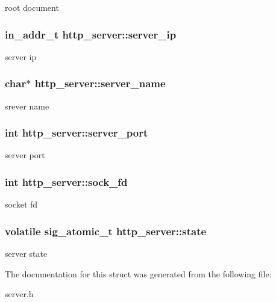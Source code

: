 \label{structhttp__server_a25d2bb352f5d3fdd09ce7fbe266f6aac}
root document \hypertarget{structhttp__server_ad3110d5628168b14bcdcc7a7fed3f021}{
\subsubsection[{server\_\-ip}]{\setlength{\rightskip}{0pt plus 5cm}in\_\-addr\_\-t {\bf http\_\-server::server\_\-ip}}}
\label{structhttp__server_ad3110d5628168b14bcdcc7a7fed3f021}
server ip \hypertarget{structhttp__server_afdeb11488dbc8aa350c3f7506ec65eba}{
\subsubsection[{server\_\-name}]{\setlength{\rightskip}{0pt plus 5cm}char$\ast$ {\bf http\_\-server::server\_\-name}}}
\label{structhttp__server_afdeb11488dbc8aa350c3f7506ec65eba}
srever name \hypertarget{structhttp__server_a8f2e0f8f3c7919c65797bd2839723f45}{
\subsubsection[{server\_\-port}]{\setlength{\rightskip}{0pt plus 5cm}int {\bf http\_\-server::server\_\-port}}}
\label{structhttp__server_a8f2e0f8f3c7919c65797bd2839723f45}
server port \hypertarget{structhttp__server_a206c0a97950f18794d7af217796eeb8d}{
\subsubsection[{sock\_\-fd}]{\setlength{\rightskip}{0pt plus 5cm}int {\bf http\_\-server::sock\_\-fd}}}
\label{structhttp__server_a206c0a97950f18794d7af217796eeb8d}
socket fd \hypertarget{structhttp__server_a8f13ce40020f68f463f426722c69f85d}{
\subsubsection[{state}]{\setlength{\rightskip}{0pt plus 5cm}volatile sig\_\-atomic\_\-t {\bf http\_\-server::state}}}
\label{structhttp__server_a8f13ce40020f68f463f426722c69f85d}
server state 

The documentation for this struct was generated from the following file:\begin{DoxyCompactItemize}
\item 
server.h\end{DoxyCompactItemize}
